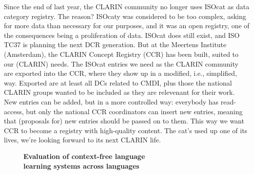 \documentclass[10pt, a4paper, twopage, headinclude, footinclude, BCOR5mm]{scrartcl}
\begin{document}
        \begin{table}[t!]
    \end{table}

\noindent
Since the end of last year, the CLARIN community no longer uses ISOcat as data category registry. The reason? ISOcaty was considered to be too complex, asking for more data than necessary for our purposes, and it was an open registry, one of the consequences being a proliferation of data.  ISOcat does still exist, and ISO TC37 is planning the next DCR generation. But at the Meertens Institute (Amsterdam), the CLARIN Concept Registry (CCR) has been built, suited to our (CLARIN) needs.  The ISOcat entries we need as the CLARIN community are exported into the  CCR, where they show up in a modified, i.e., simplified, way. Exported are at least all DCs related to CMDI, plus those the national CLARIN groups wanted to be included as they are relevenant for their work. New entries can be added, but in a more controlled way: everybody has read-access, but only the national CCR coordinators can  insert new entries, meaning that (proposals for) new entries should be passed on to them. This way we want CCR to become a registry with high-quality content.   The cat's used up one of its lives, we're looking forward to its next CLARIN life.


\newpage

\begin{figure}[t!]
\centering
\large\textbf{Evaluation of context-free language \\ learning systems across languages}
\vspace*{0.5cm}
\end{figure}
\end{document}
